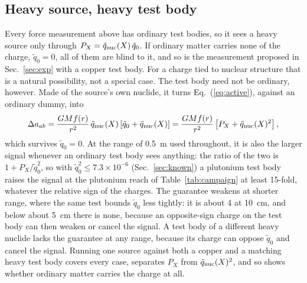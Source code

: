 \documentclass[aps,prd,onecolumn,superscriptaddress,floatfix,nofootinbib]{revtex4-2}
\newcommand{\qt}{\tilde q}
\begin{document}
\subsection{Heavy source, heavy test body}\label{sec:heavy}

Every force measurement above has ordinary test bodies, so it sees a heavy source only through
$P_X=\qt_{\rm nuc}(X)\,\qt_0$. If ordinary matter carries none of the charge, $\qt_0=0$, all of them are blind to it,
and so is the measurement proposed in Sec.~\ref{sec:exp} with a copper test body. For a charge tied to nuclear
structure that is a natural possibility, not a special case. The test body need not be ordinary, however. Made of
the source's own nuclide, it turns Eq.~(\ref{eq:active}), against an ordinary dummy, into
\begin{equation}
\Delta a_{ab} = \frac{G M f(r)}{r^2}\,\qt_{\rm nuc}(X)\left[\qt_0+\qt_{\rm nuc}(X)\right]
= \frac{G M f(r)}{r^2}\left[P_X+\qt_{\rm nuc}(X)^2\right],
\label{eq:heavy}
\end{equation}
which survives $\qt_0=0$. At the range of 0.5~m used throughout, it is also the larger signal whenever an ordinary
test body sees anything: the ratio of the two is $1+P_X/\qt_0^2$, so with $\qt_0^2\le7.3\times10^{-6}$
(Sec.~\ref{sec:known}) a plutonium test body raises the signal at the plutonium reach of Table~\ref{tab:campaign} at
least 15-fold, whatever the relative sign of the charges. The guarantee weakens at shorter range, where the same test
bounds $\qt_0$ less tightly: it is about 4 at 10~cm, and below about 5~cm there is none, because an opposite-sign
charge on the test body can then weaken or cancel the signal. A test body of a different heavy nuclide lacks the
guarantee at any range, because its charge can oppose $\qt_0$ and cancel the signal. Running one source against both
a copper and a matching heavy test body covers every case, separates $P_X$ from $\qt_{\rm nuc}(X)^2$, and so shows
whether ordinary matter carries the charge at all.
\end{document}
